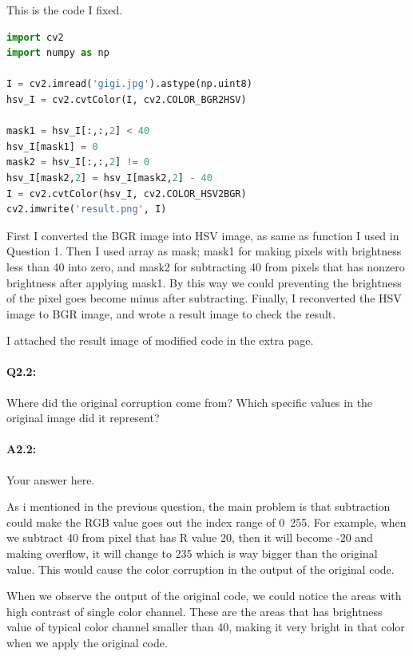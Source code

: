 \documentclass[11pt]{article}
\begin{document}
This is the code I fixed.

\begin{lstlisting}[language=Python]
import cv2
import numpy as np

I = cv2.imread('gigi.jpg').astype(np.uint8)
hsv_I = cv2.cvtColor(I, cv2.COLOR_BGR2HSV)

mask1 = hsv_I[:,:,2] < 40
hsv_I[mask1] = 0
mask2 = hsv_I[:,:,2] != 0
hsv_I[mask2,2] = hsv_I[mask2,2] - 40
I = cv2.cvtColor(hsv_I, cv2.COLOR_HSV2BGR)
cv2.imwrite('result.png', I)
\end{lstlisting}

First I converted the BGR image into HSV image, as same as function I used in Question 1. Then I used array as mask; mask1 for making pixels with brightness less than 40 into zero, and mask2 for subtracting 40 from pixels that has nonzero brightness after applying mask1. By this way we could preventing the brightness of the pixel goes become minus after subtracting. Finally, I reconverted the HSV image to BGR image, and wrote a result image to check the result.

I attached the result image of modified code in the extra page. 

\pagebreak
\paragraph{Q2.2:} Where did the original corruption come from? Which specific values in the original image did it represent?

\paragraph{A2.2:} Your answer here.

As i mentioned in the previous question, the main problem is that subtraction could make the RGB value goes out the index range of 0~255. For example, when we subtract 40 from pixel that has R value 20, then it will become -20 and making overflow, it will change to 235 which is way bigger than the original value. This would cause the color corruption in the output of the original code. 

When we observe the output of the original code, we could notice the areas with high contrast of single color channel. These are the areas that has brightness value of typical color channel smaller than 40, making it very bright in that color when we apply the original code.
\end{document}

